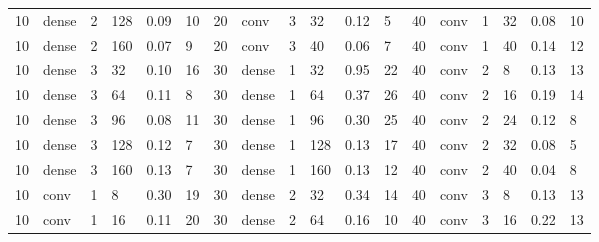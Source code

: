 \begin{table}
{\begin{tabular}{@{}llllll|llllll|llllll@{}}
10          & dense      & 2          & 128        & 0.09         & 10           & 20          & conv       & 3          & 32         & 0.12         & 5            & 40          & conv       & 1          & 32         & 0.08         & 10           \\
10          & dense      & 2          & 160        & 0.07         & 9            & 20          & conv       & 3          & 40         & 0.06         & 7            & 40          & conv       & 1          & 40         & 0.14         & 12           \\
10          & dense      & 3          & 32         & 0.10         & 16           & 30          & dense      & 1          & 32         & 0.95         & 22           & 40          & conv       & 2          & 8          & 0.13         & 13           \\
10          & dense      & 3          & 64         & 0.11         & 8            & 30          & dense      & 1          & 64         & 0.37         & 26           & 40          & conv       & 2          & 16         & 0.19         & 14           \\
10          & dense      & 3          & 96         & 0.08         & 11           & 30          & dense      & 1          & 96         & 0.30         & 25           & 40          & conv       & 2          & 24         & 0.12         & 8            \\
10          & dense      & 3          & 128        & 0.12         & 7            & 30          & dense      & 1          & 128        & 0.13         & 17           & 40          & conv       & 2          & 32         & 0.08         & 5            \\
10          & dense      & 3          & 160        & 0.13         & 7            & 30          & dense      & 1          & 160        & 0.13         & 12           & 40          & conv       & 2          & 40         & 0.04         & 8            \\
10          & conv       & 1          & 8          & 0.30         & 19           & 30          & dense      & 2          & 32         & 0.34         & 14           & 40          & conv       & 3          & 8          & 0.13         & 13           \\
10          & conv       & 1          & 16         & 0.11         & 20           & 30          & dense      & 2          & 64         & 0.16         & 10           & 40          & conv       & 3          & 16         & 0.22         & 13           \\

\end{tabular}}
\end{table}
